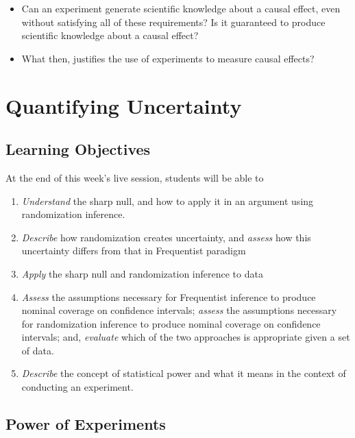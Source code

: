 \documentclass[
]{book}
\providecommand{\tightlist}{%
  \setlength{\itemsep}{0pt}\setlength{\parskip}{0pt}}
\begin{document}
\begin{itemize}
\tightlist
\item
  Can an experiment generate scientific knowledge about a causal effect,
  even without satisfying all of these requirements? Is it guaranteed to
  produce scientific knowledge about a causal effect?
\item
  What then, justifies the use of experiments to measure causal effects?
\end{itemize}

\hypertarget{quantifying-uncertainty}{%
\chapter{Quantifying Uncertainty}\label{quantifying-uncertainty}}

\hypertarget{learning-objectives-2}{%
\section{Learning Objectives}\label{learning-objectives-2}}

At the end of this week's live session, students will be able to

\begin{enumerate}
\def\labelenumi{\arabic{enumi}.}
\tightlist
\item
  \emph{Understand} the sharp null, and how to apply it in an argument
  using randomization inference.
\item
  \emph{Describe} how randomization creates uncertainty, and
  \emph{assess} how this uncertainty differs from that in Frequentist
  paradigm
\item
  \emph{Apply} the sharp null and randomization inference to data
\item
  \emph{Assess} the assumptions necessary for Frequentist inference to
  produce nominal coverage on confidence intervals; \emph{assess} the
  assumptions necessary for randomization inference to produce nominal
  coverage on confidence intervals; and, \emph{evaluate} which of the
  two approaches is appropriate given a set of data.
\item
  \emph{Describe} the concept of statistical power and what it means in
  the context of conducting an experiment.
\end{enumerate}

\hypertarget{power-of-experiments}{%
\section{Power of Experiments}\label{power-of-experiments}}
\end{document}
